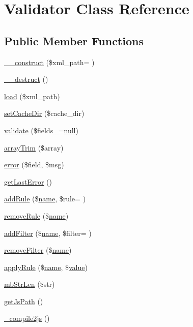 \hypertarget{classValidator}{}\section{Validator Class Reference}
\label{classValidator}
\subsection*{Public Member Functions}
\begin{DoxyCompactItemize}
\item 
\hyperlink{classValidator_abfd7a6c58dc8cedae5bef76325b7bf6e}{\+\_\+\+\_\+construct} (\$xml\+\_\+path= \textquotesingle{}\textquotesingle{})
\item 
\hyperlink{classValidator_aa076d09e847e8461281d4912688a9388}{\+\_\+\+\_\+destruct} ()
\item 
\hyperlink{classValidator_a43de0eb69cae01eee855f825324ffc39}{load} (\$xml\+\_\+path)
\item 
\hyperlink{classValidator_a1630131530dca60428e72dd4dd2d4af3}{set\+Cache\+Dir} (\$cache\+\_\+dir)
\item 
\hyperlink{classValidator_a05e34dac507b8d719e7f95f2cd0220bc}{validate} (\$fields\+\_\+=\hyperlink{modernizr_8min_8js_a286f9ec831c5e676eeb493248eab9575}{null})
\item 
\hyperlink{classValidator_ac4be365554a620a921f6846e80d76671}{array\+Trim} (\$array)
\item 
\hyperlink{classValidator_ad46fa003b320d64ef656b22de870782c}{error} (\$field, \$msg)
\item 
\hyperlink{classValidator_a3de1a1112e46b42ab6a89a4a13048504}{get\+Last\+Error} ()
\item 
\hyperlink{classValidator_a71cc158b6b3f52f03e1ddb34f4801906}{add\+Rule} (\$\hyperlink{common_8js_a22c29d2aa8ed6161ce8faa718ef76e68}{name}, \$rule= \textquotesingle{}\textquotesingle{})
\item 
\hyperlink{classValidator_acc2d2fd527f54e1fed839a927a83c6b8}{remove\+Rule} (\$\hyperlink{common_8js_a22c29d2aa8ed6161ce8faa718ef76e68}{name})
\item 
\hyperlink{classValidator_a5f22a8ddf58df13376769ed422492e33}{add\+Filter} (\$\hyperlink{common_8js_a22c29d2aa8ed6161ce8faa718ef76e68}{name}, \$filter= \textquotesingle{}\textquotesingle{})
\item 
\hyperlink{classValidator_a7613a0d6b468b5d5ade046a801b260db}{remove\+Filter} (\$\hyperlink{common_8js_a22c29d2aa8ed6161ce8faa718ef76e68}{name})
\item 
\hyperlink{classValidator_a8a8be8c74216e9d0ebbd99eb1e29b8d2}{apply\+Rule} (\$\hyperlink{common_8js_a22c29d2aa8ed6161ce8faa718ef76e68}{name}, \$\hyperlink{common_2js_2jquery_8js_abe5393d870043cf6aaa1d5ad5fce755c}{value})
\item 
\hyperlink{classValidator_a46de77869676b1b027a076c2106653e2}{mb\+Str\+Len} (\$str)
\item 
\hyperlink{classValidator_ae9037d1911390583a1358b25c03768e3}{get\+Js\+Path} ()
\item 
\hyperlink{classValidator_ae7b44a7a2bfb3ee4672b4cf2cdbd059f}{\+\_\+compile2js} ()
\end{DoxyCompactItemize}

